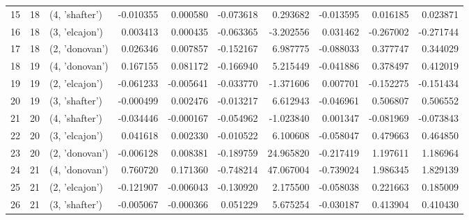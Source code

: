 \begin{tabular}{lrlrrrrrrr}
15 &     18 &  (4, 'shafter') & -0.010355 &   0.000580 & -0.073618 &   0.293682 & -0.013595 &   0.016185 &  0.023871 \\
16 &     18 &  (3, 'elcajon') &  0.003413 &   0.000435 & -0.063365 &  -3.202556 &  0.031462 &  -0.267002 & -0.271744 \\
17 &     18 &  (2, 'donovan') &  0.026346 &   0.007857 & -0.152167 &   6.987775 & -0.088033 &   0.377747 &  0.344029 \\
18 &     19 &  (4, 'donovan') &  0.167155 &   0.081172 & -0.166940 &   5.215449 & -0.041886 &   0.378497 &  0.412019 \\
19 &     19 &  (2, 'elcajon') & -0.061233 &  -0.005641 & -0.033770 &  -1.371606 &  0.007701 &  -0.152275 & -0.151434 \\
20 &     19 &  (3, 'shafter') & -0.000499 &   0.002476 & -0.013217 &   6.612943 & -0.046961 &   0.506807 &  0.506552 \\
21 &     20 &  (4, 'shafter') & -0.034446 &  -0.000167 & -0.054962 &  -1.023840 &  0.001347 &  -0.081969 & -0.073843 \\
22 &     20 &  (3, 'elcajon') &  0.041618 &   0.002330 & -0.010522 &   6.100608 & -0.058047 &   0.479663 &  0.464850 \\
23 &     20 &  (2, 'donovan') & -0.006128 &   0.008381 & -0.189759 &  24.965820 & -0.217419 &   1.197611 &  1.186964 \\
24 &     21 &  (4, 'donovan') &  0.760720 &   0.171360 & -0.748214 &  47.067004 & -0.739024 &   1.986345 &  1.829139 \\
25 &     21 &  (2, 'elcajon') & -0.121907 &  -0.006043 & -0.130920 &   2.175500 & -0.058038 &   0.221663 &  0.185009 \\
26 &     21 &  (3, 'shafter') & -0.005067 &  -0.000366 &  0.051229 &   5.675254 & -0.030187 &   0.413904 &  0.410430 \\
\bottomrule
\end{tabular}

